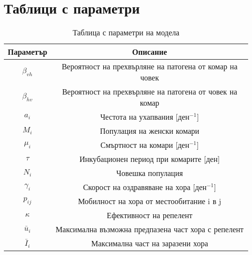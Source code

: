 \section{\hspace{1em} Таблици с параметри}

\begin{table}[ht]
  \centering
  \begin{tabular}{ |c c| }
    \hline
    Параметър & Описание\\
    \hline
    $\beta_{vh}$ & Вероятност на прехвърляне на патогена от комар на човек \\
    $\beta_{hv}$ & Вероятност на прехвърляне на патогена от човек на комар \\
    $a_i$ & Честота на ухапвания [$\text{ден}^{-1}$]\\
    $M_i$ & Популация на женски комари\\
    $\mu_i$ & Смъртност на комари [$\text{ден}^{-1}$]\\
    $\tau$ & Инкубационен период при комарите [$\text{ден}$]\\
    $N_i$ & Човешка популация\\
    $\gamma_i$ & Скорост на оздравяване на хора [$\text{ден}^{-1}$]\\
    $p_{ij}$ & Мобилност на хора от местообитание i в j\\
    $\kappa$ & Ефективност на репелент\\
    $\bar{u}_i$ & Максимална възможна предпазена част хора с репелент\\
    $\bar{I}_i$ & Максимална част на заразени хора\\
    \hline
  \end{tabular}
  \caption{Таблица с параметри на модела}
  \label{tbl:ParameterDefinitions}
\end{table}

